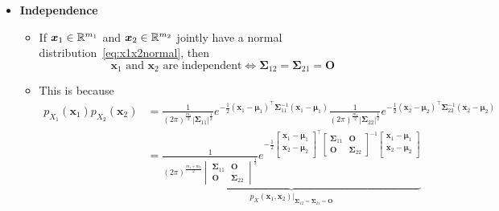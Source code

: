 \documentclass[12pt,a4paper]{article}
\begin{document}
\begin{itemize}
\begin{itemize}
  \end{itemize}

\item \textbf{Independence}
  \begin{itemize}

  \item If $\bm{x}_{1}\in \mathbb{R}^{m_{1}}$ and $\bm{x}_{2}\in \mathbb{R}^{m_{2}}$ jointly have a normal distribution~\eqref{eq:x1x2normal},
    then
    \begin{equation}\nonumber%
      \text{$\bm{x}_{1}$ and $\bm{x}_{2}$ are independent}
      \iff
      \bm{\Sigma}_{12} = \bm{\Sigma}_{21} = \bm{O}
    \end{equation}
  \item This is because
    \begin{align}
      p_{X_{1}}(\bm{x}_{1})p_{X_{2}}(\bm{x}_{2})
      & = \frac{1}{(2\pi)^{\frac{m_{1}}{2}}|\bm{\Sigma}_{11}|^{\frac{1}{2}}}e^{- \frac{1}{2}(\bm{x}_{1}-\bm{\mu}_{1})^{\top}\bm{\Sigma}_{11}^{-1}(\bm{x}_{1}-\bm{\mu}_{1})}\frac{1}{(2\pi)^{\frac{m_{2}}{2}}|\bm{\Sigma}_{22}|^{\frac{1}{2}}}e^{- \frac{1}{2}(\bm{x}_{2}-\bm{\mu}_{2})^{\top}\bm{\Sigma}_{22}^{-1}(\bm{x}_{2}-\bm{\mu}_{2})}  \nonumber \\
      & =
        \underbrace{
      \frac{1}{(2\pi)^{\frac{m_{1}+m_{2}}{2}}\begin{vmatrix}\bm{\Sigma}_{11}&\bm{O}\\\bm{O}&\bm{\Sigma}_{22}\end{vmatrix}^{\frac{1}{2}}}
      e^{- \frac{1}{2}
        \begin{bmatrix}
          \bm{x}_{1}-\bm{\mu}_{1}\\
          \bm{x}_{2}-\bm{\mu}_{2}\\
        \end{bmatrix}^{\top}
        \begin{bmatrix}
          \bm{\Sigma}_{11}&\bm{O}\\
          \bm{O} &\bm{\Sigma}_{22}
        \end{bmatrix}^{-1}
        \begin{bmatrix}
          \bm{x}_{1}-\bm{\mu}_{1}\\
          \bm{x}_{2}-\bm{\mu}_{2}\\
        \end{bmatrix}}
        }_{p_{X}(\bm{x}_{1},\bm{x}_{2})\big|_{\bm{\Sigma}_{12}=\bm{\Sigma}_{21}=\bm{O}}}
      \nonumber%
    \end{align}

  \end{itemize}


\end{itemize}
\end{document}
